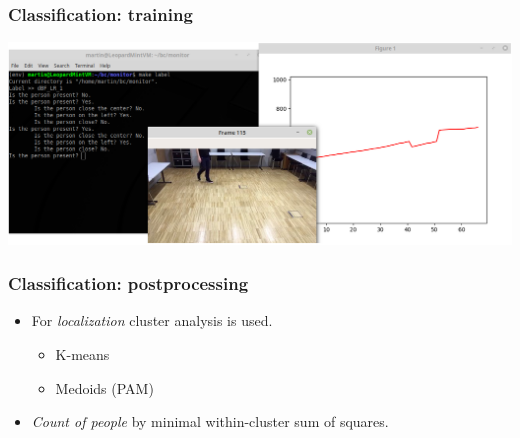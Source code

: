 \documentclass[10pt,xcolor=pdflatex]{beamer}
\begin{document}
\begin{frame}\frametitle{Classification: training}
    \begin{center}
        \includegraphics[width=1\textwidth]{img/labelling.png}
    \end{center}
\end{frame}

\begin{frame}\frametitle{Classification: postprocessing}
    \begin{itemize}
        \item For \emph{localization} cluster analysis is used.
            \begin{itemize}
                \item K-means
                \item Medoids (PAM)
            \end{itemize}
        \item \emph{Count of people} by minimal within-cluster sum of squares.
    \end{itemize}
\end{frame}

\end{document}
